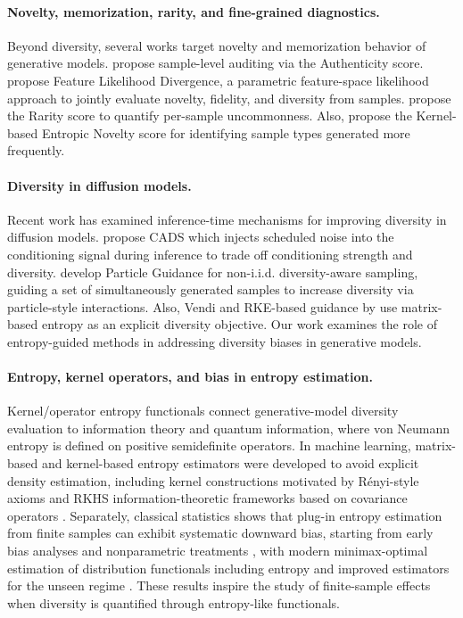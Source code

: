 \documentclass{article}
\theoremstyle{plain}
\theoremstyle{definition}
\begin{document}
\paragraph{Novelty, memorization, rarity, and fine-grained diagnostics.}
Beyond diversity, several works target novelty and memorization behavior of generative models. \citet{alaa2022faithful} propose sample-level auditing via the Authenticity score.  \citet{jiralerspong2023fld} propose Feature Likelihood Divergence, a parametric feature-space likelihood approach to jointly evaluate novelty, fidelity, and diversity from samples. \citet{han2022rarity} propose the Rarity score to quantify per-sample uncommonness. Also, \citet{zhang2024ken} propose the Kernel-based Entropic Novelty score for identifying sample types generated more frequently.

\paragraph{Diversity in diffusion models.} Recent work has examined inference-time mechanisms for improving diversity in diffusion models. \citet{sadat2024cads} propose CADS which injects scheduled noise into the conditioning signal during inference to trade off conditioning strength and diversity. \citet{corso2024particle} develop Particle Guidance for non-i.i.d. diversity-aware sampling, guiding a set of simultaneously generated samples to increase diversity via particle-style interactions. Also, Vendi and RKE-based guidance by \citet{hemmat2024cvsg,jalali2025sparke} use matrix-based entropy as an explicit diversity objective. Our work examines the role of entropy-guided methods in addressing diversity biases in generative models.

\paragraph{Entropy, kernel operators, and bias in entropy estimation.}
Kernel/operator entropy functionals connect generative-model diversity evaluation to information theory and quantum information, where von Neumann entropy is defined on positive semidefinite operators. In machine learning, matrix-based and kernel-based entropy estimators were developed to avoid explicit density estimation, including kernel constructions motivated by Rényi-style axioms \citep{sanchezgiraldo2012entropy} and RKHS information-theoretic frameworks based on covariance operators \citep{bach2022itkernel}. Separately, classical statistics shows that plug-in entropy estimation from finite samples can exhibit systematic downward bias, starting from early bias analyses \citep{miller1955bias} and nonparametric treatments \citep{paninski2003entropy}, with modern minimax-optimal estimation of distribution functionals including entropy \citep{jiao2015minimax} and improved estimators for the unseen regime \citep{valiant2013unseen}. These results inspire the study of finite-sample effects when diversity is quantified through entropy-like functionals.
\end{document}
